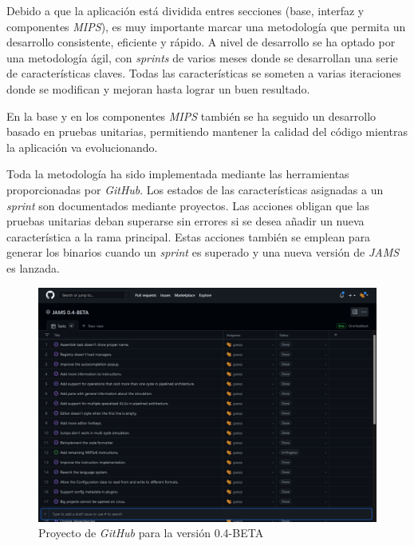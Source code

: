 Debido a que la aplicación está dividida entres secciones (base, interfaz y componentes \textit{MIPS}),
es muy importante marcar una metodología que permita un desarrollo consistente, eficiente y rápido.
A nivel de desarrollo se ha optado por una metodología ágil, con \textit{sprints} de varios meses
donde se desarrollan una serie de características claves.
Todas las características se someten a varias iteraciones donde se modifican y mejoran hasta lograr un
buen resultado.

\noindent En la base y en los componentes \textit{MIPS} también se ha seguido un
desarrollo basado en pruebas unitarias, permitiendo mantener la calidad del código mientras la
aplicación va evolucionando.

\noindent Toda la metodología ha sido implementada mediante las herramientas proporcionadas por \textit{GitHub}.
Los estados de las características asignadas a un \textit{sprint} son documentados mediante proyectos.
Las acciones obligan que las pruebas unitarias deban superarse sin errores si se desea añadir un nueva
característica a la rama principal.
Estas acciones también se emplean para generar los binarios cuando un \textit{sprint} es superado y una
nueva versión de \textit{JAMS} es lanzada.

\begin{figure}[H]
    \centering
    \includegraphics[width=\textwidth]{images/introduction/github}
    \caption{Proyecto de \textit{GitHub} para la versión 0.4-BETA}
    \label{fig:introduccion-github}
\end{figure}